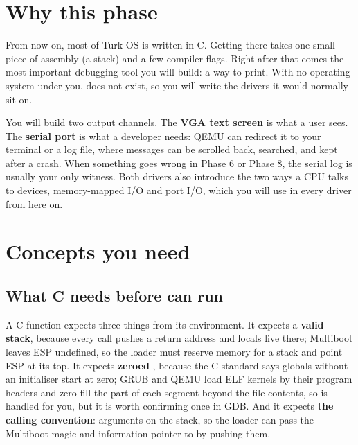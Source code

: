 \documentclass[11pt,a4paper]{article}
\begin{document}


\section{Why this phase}

From now on, most of Turk-OS is written in C. Getting there takes one small piece of assembly (a stack) and a few
compiler flags. Right after that comes the most important debugging tool you will build: a way to print. With no
operating system under you,  does not exist, so you will write the drivers it would normally sit on.

You will build two output channels. The \textbf{VGA text screen} is what a user sees. The \textbf{serial port} is
what a developer needs: QEMU can redirect it to your terminal or a log file, where messages can be scrolled back,
searched, and kept after a crash. When something goes wrong in Phase 6 or Phase 8, the serial log is usually your
only witness. Both drivers also introduce the two ways a CPU talks to devices, memory-mapped I/O and port I/O, which
you will use in every driver from here on.

\section{Concepts you need}

\subsection{What C needs before \texorpdfstring{}{kmain} can run}

A C function expects three things from its environment. It expects a \textbf{valid stack}, because every call
pushes a return address and locals live there; Multiboot leaves ESP undefined, so the loader must reserve memory for
a stack and point ESP at its top. It expects \textbf{zeroed }, because the C standard says globals without
an initialiser start at zero; GRUB and QEMU load ELF kernels by their program headers and zero-fill the part of each
segment beyond the file contents, so  is handled for you, but it is worth confirming once in GDB. And it
expects \textbf{the calling convention}: arguments on the stack, so the loader can pass the Multiboot magic and
information pointer to  by pushing them.
\end{document}
